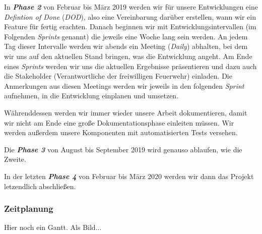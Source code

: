 In \textit{\textbf{Phase 2}} von Februar bis März 2019 werden wir für unsere Entwicklungen eine \textit{Defintion of Done} (\textit{DOD}), also eine Vereinbarung darüber erstellen, wann wir ein Feature für fertig erachten. Danach beginnen wir mit Entwicklungsintervallen (im Folgenden \textit{Sprints }genannt) die jeweils eine Woche lang sein werden. An jedem Tag dieser Intervalle werden wir abends ein Meeting (\textit{Daily}) abhalten, bei dem wir uns auf den aktuellen Stand bringen, was die Entwicklung angeht. Am Ende eines \textit{Sprints} werden wir uns die aktuellen Ergebnisse präsentieren und dazu auch die Stakeholder (Verantwortliche der freiwilligen Feuerwehr) einladen. Die Anmerkungen aus diesen Meetings werden wir jeweils in den folgenden \textit{Sprint} aufnehmen, in die Entwicklung einplanen und umsetzen. 

Währenddessen werden wir immer wieder unsere Arbeit dokumentieren, damit wir nicht am Ende eine große Dokumentationsphase einleiten müssen. Wir werden außerdem unsere Komponenten mit automatisierten Tests versehen.

Die \textit{\textbf{Phase 3}} von August bis September 2019 wird genauso ablaufen, wie die Zweite.

In der letzten \textit{\textbf{Phase 4}} von Februar bis März 2020 werden wir dann das Projekt letzendlich abschließen.  

\subsubsection{Zeitplanung}

Hier noch ein Gantt. Als Bild...

\newpage